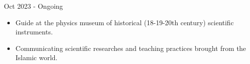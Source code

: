 %
%
%


\begin{experiences}
     {Oct 2023 - Ongoing}%
    {
     \begin{itemize}
         \item Guide at the physics museum of historical (18-19-20th century) scientific instruments.
     \end{itemize}}
     \smallskip
    {
     \begin{itemize}
         \item Communicating scientific researches and teaching practices brought from the Islamic world.
     \end{itemize}}


\end{experiences}

